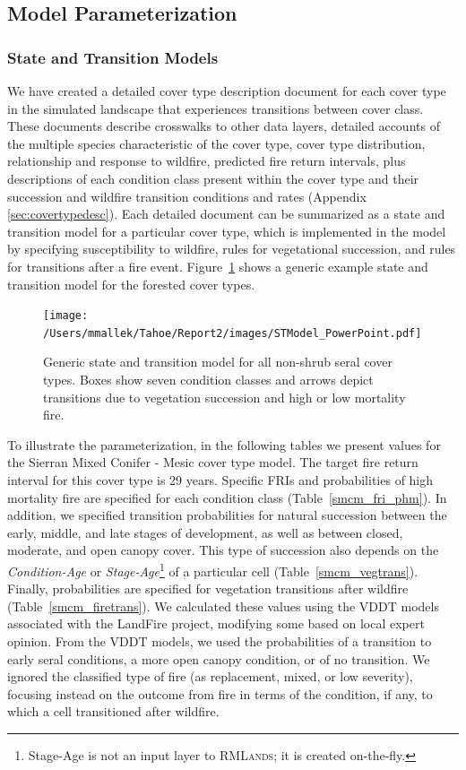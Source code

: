 \subsection{Model Parameterization}
\label{subsec:hrvmodelparam}

\subsubsection{State and Transition Models}
We have created a detailed cover type description document for each cover type in the simulated landscape that experiences transitions between cover class. These documents describe crosswalks to other data layers, detailed accounts of the multiple species characteristic of the cover type, cover type distribution, relationship and response to wildfire, predicted fire return intervals, plus descriptions of each condition class present within the cover type and their succession and wildfire transition conditions and rates (Appendix \ref{sec:covertypedesc}). Each detailed document can be summarized as a state and transition model for a particular cover type, which is implemented in the model by specifying susceptibility to wildfire, rules for vegetational succession, and rules for transitions after a fire event. Figure~\ref{transmodel} shows a generic example state and transition model for the forested cover types.

\begin{figure}[htbp]
\centering
\texttt{[image: /Users/mmallek/Tahoe/Report2/images/STModel\_PowerPoint.pdf]}
\caption{Generic state and transition model for all non-shrub seral cover types. Boxes show seven condition classes and arrows depict transitions due to vegetation succession and high or low mortality fire.} 
\label{transmodel}
\end{figure}

To illustrate the parameterization, in the following tables we present values for the Sierran Mixed Conifer - Mesic cover type model. The target fire return interval for this cover type is 29 years. Specific FRIs and probabilities of high mortality fire are specified for each condition class (Table~\ref{smcm_fri_phm}). In addition, we specified transition probabilities for natural succession between the early, middle, and late stages of development, as well as between closed, moderate, and open canopy cover. This type of succession also depends on the \emph{Condition-Age} or \emph{Stage-Age}\footnote{Stage-Age is not an input layer to \textsc{RMLands}; it is created on-the-fly.} of a particular cell (Table~\ref{smcm_vegtrans}). Finally, probabilities are specified for vegetation transitions after wildfire (Table~\ref{smcm_firetrans}). We calculated these values using the VDDT models associated with the LandFire project, modifying some based on local expert opinion. From the VDDT models, we used the probabilities of a transition to early seral conditions, a more open canopy condition, or of no transition. We ignored the classified type of fire (as replacement, mixed, or low severity), focusing instead on the outcome from fire in terms of the condition, if any, to which a cell transitioned after wildfire.


